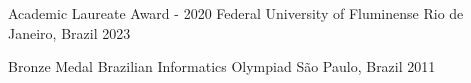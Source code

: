 



\begin{cvhonors}

  \cvhonor
    {Academic Laureate Award - 2020} %
    {Federal University of Fluminense} %
    {Rio de Janeiro, Brazil} %
    {2023} %

\end{cvhonors}




\begin{cvhonors}

  \cvhonor
    {Bronze Medal} %
    {Brazilian Informatics Olympiad} %
    {São Paulo, Brazil} %
    {2011} %

\end{cvhonors}




